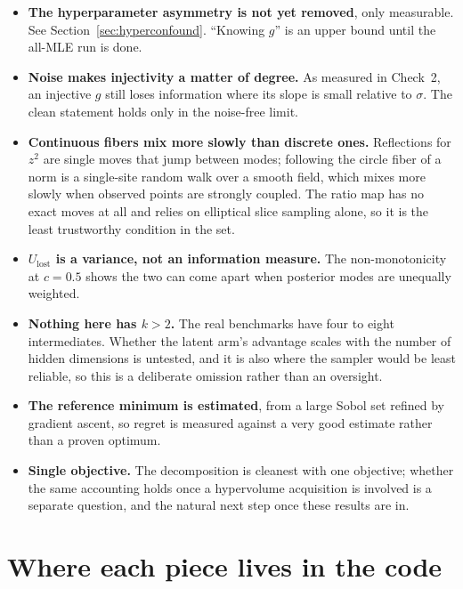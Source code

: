 \documentclass[11pt]{article}
\newcommand{\Ulost}{U_{\text{lost}}}
\begin{document}
\begin{itemize}
\item \textbf{The hyperparameter asymmetry is not yet removed}, only measurable.
See Section~\ref{sec:hyperconfound}. ``Knowing $g$'' is an upper bound until the
all-MLE run is done.

\item \textbf{Noise makes injectivity a matter of degree.} As measured in
Check~2, an injective $g$ still loses information where its slope is small
relative to $\sigma$. The clean statement holds only in the noise-free limit.

\item \textbf{Continuous fibers mix more slowly than discrete ones.} Reflections
for $z^2$ are single moves that jump between modes; following the circle fiber
of a norm is a single-site random walk over a smooth field, which mixes more
slowly when observed points are strongly coupled. The ratio map has no exact
moves at all and relies on elliptical slice sampling alone, so it is the least
trustworthy condition in the set.

\item \textbf{$\Ulost$ is a variance, not an information measure.} The
non-monotonicity at $c=0.5$ shows the two can come apart when posterior modes are
unequally weighted.

\item \textbf{Nothing here has $k>2$.} The real benchmarks have four to eight
intermediates. Whether the latent arm's advantage scales with the number of
hidden dimensions is untested, and it is also where the sampler would be least
reliable, so this is a deliberate omission rather than an oversight.

\item \textbf{The reference minimum is estimated}, from a large Sobol set refined
by gradient ascent, so regret is measured against a very good estimate rather
than a proven optimum.

\item \textbf{Single objective.} The decomposition is cleanest with one
objective; whether the same accounting holds once a hypervolume acquisition is
involved is a separate question, and the natural next step once these results are
in.
\end{itemize}

\appendix
\section{Where each piece lives in the code}
\end{document}
